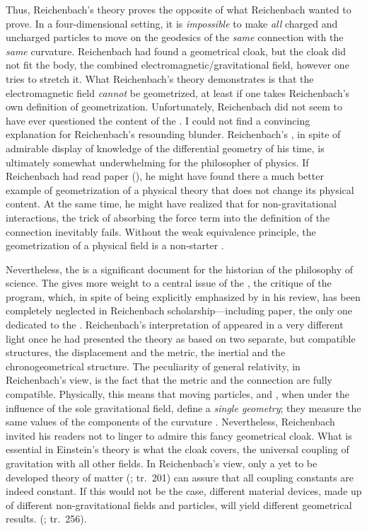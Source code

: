 \documentclass[submitted]{article}
\newcommand{\PRZL}{\citetitle{Reichenbach1928}\xspace}
\renewcommand{\rzlp}[2]{(\cite[#1]{Reichenbach1928}; tr.\ #2)\xspace}
\begin{document}
Thus, Reichenbach's theory proves the opposite of what Reichenbach wanted to prove. In a four-dimensional setting, it is \emph{impossible} to make \emph{all} charged and uncharged particles to move on the geodesics of the \emph{same} connection with the \emph{same} curvature. Reichenbach had found a geometrical cloak, but the cloak did not fit the body, the combined electromagnetic/gravitational field, however one tries to stretch it. What Reichenbach's theory demonstrates is that the electromagnetic field \emph{cannot} be geometrized, at least if one takes Reichenbach's own definition of geometrization. Unfortunately, Reichenbach did not seem to have ever questioned the content of the \Ap \citep{Einstein1928a,Einstein1929b}. I could not find a convincing explanation for Reichenbach's resounding blunder. Reichenbach's \Ap, in spite of admirable display of knowledge of the differential geometry of his time, is ultimately somewhat underwhelming for the philosopher of physics. If Reichenbach had read  paper (), he might have found there a much better example of geometrization of a physical theory that does not change its physical content. At the same time, he might have realized that for non-gravitational interactions, the trick of absorbing the force term into the definition of the connection inevitably fails. Without the weak equivalence principle, the geometrization of a physical field is a non-starter \citep[see, however, ]{Droz-Vincent1967}.

Nevertheless, the \Ap is a significant document for the historian of the philosophy of science. The \Ap gives more weight to a central issue of the \PRZL, the critique of the  program, which, in spite of being explicitly emphasized by \citet{Einstein1928d} in his review, has been completely neglected in Reichenbach scholarship---including  paper, the only one dedicated to the \Ap. Reichenbach's interpretation of \gr appeared in a very different light once he had presented the theory as based on two separate, but compatible structures, the displacement and the metric, the inertial and the chronogeometrical structure. The peculiarity of general relativity, in Reichenbach's view, is the fact that the metric and the connection are fully compatible. Physically, this means that moving particles, and \rac, when under the influence of the sole gravitational field, define a \emph{single geometry}; they measure the same values of the components of the curvature \rite. Nevertheless, Reichenbach invited his readers not to linger to admire this fancy geometrical cloak. What is essential in Einstein's theory is what the cloak covers, the universal coupling of gravitation with all other fields. In Reichenbach's view, only a yet to be developed theory of matter \rzlp{233}{201} can assure that all coupling constants are indeed constant. If this would not be the case, different material devices, made up of different non-gravitational fields and particles, will yield different geometrical results.  \rzlp{295}{256}.
\end{document}
